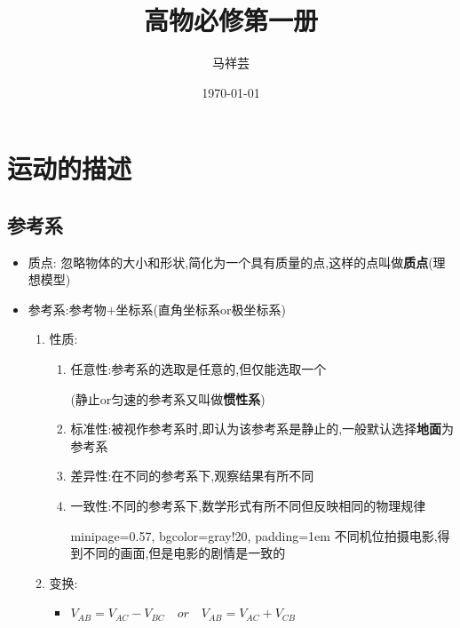 \documentclass{article}
\title{高物必修第一册}
\author{马祥芸}
\date{\today}  %
\begin{document}
\maketitle
\newpage
\tableofcontents
\newpage
{}

\section{运动的描述}

\subsection{参考系}

    \begin{itemize}
        \item 质点: 忽略物体的大小和形状,简化为一个具有质量的点,这样的点叫做\textbf{质点}(理想模型)
        \item 参考系:参考物$+$坐标系(直角坐标系or极坐标系)
        \begin{enumerate}
            \item 性质:
            \begin{enumerate}
                \item 任意性:参考系的选取是任意的,但仅能选取一个
                
                \hspace{3.5em}(静止or匀速的参考系又叫做\textbf{惯性系})

                \item 标准性:被视作参考系时,即认为该参考系是静止的,一般默认选择\textbf{地面}为参考系
                \item 差异性:在不同的参考系下,观察结果有所不同
                \item 一致性:不同的参考系下,数学形式有所不同但反映相同的物理规律
                
                \vspace{-1em}
                \hspace{2.6em}\begin{adjustbox}{minipage=0.57\linewidth, bgcolor=gray!20, padding=1em}
                \small %
                不同机位拍摄电影,得到不同的画面,但是电影的剧情是一致的
                \end{adjustbox}
                \vspace{-1em}
            \end{enumerate}

            \item 变换:
            \begin{itemize}
                \item[]$V_{AB} = V_{AC} - V_{BC} \quad or \quad V_{AB} = V_{AC} + V_{CB} $
            \end{itemize}
        \end{enumerate}
    \end{itemize}
\end{document}
